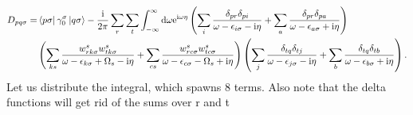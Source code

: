 \documentclass[12pt]{caltech_thesis}
\begin{document}
\begin{equation}
\begin{aligned}
D_{p q \sigma}= & \bra{p\sigma } \gamma _0^\sigma \ket{q\sigma } -\frac{\mathrm{i }}{2 \pi} \sum_{r} \sum_{t} \int_{-\infty }^{\infty } \mathrm{d} \omega \mathrm{e}^{\mathrm{i \omega \eta}} \left( \sum_i \frac{\delta_{p r} \delta_{p i}}{\omega-\epsilon_{i \sigma}-\mathrm{i} \eta}+\sum_a \frac{\delta_{p r} \delta_{p a}}{\omega-\epsilon_{a \sigma}+\mathrm{i} \eta} \right)\\
& \left( \sum_{k s} \frac{w_{r k \sigma}^s w_{t k \sigma}^s}{\omega-\epsilon_{k \sigma}+\Omega_s-\mathrm{i} \eta} +\sum_{c s} \frac{w_{r c \sigma}^s w_{t c \sigma}^s}{\omega-\epsilon_{c \sigma}-\Omega_s+\mathrm{i} \eta} \right) \left( \sum_j \frac{\delta_{t q} \delta_{t j}}{\omega-\epsilon_{j \sigma}-\mathrm{i} \eta}+\sum_b \frac{\delta_{t q} \delta_{t b}}{\omega-\epsilon_{b \sigma}+\mathrm{i} \eta} \right).
\end{aligned}
\end{equation}
Let us distribute the integral, which spawns 8 terms. Also note that the delta functions will get rid of the sums over r and t
\end{document}
